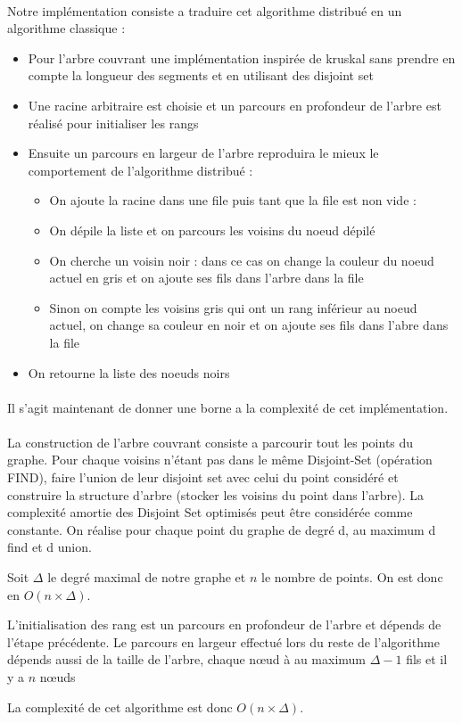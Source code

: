 \paragraph{}
Notre implémentation consiste a traduire cet algorithme distribué en un algorithme classique :
\begin{itemize}
\item Pour l'arbre couvrant une implémentation inspirée de kruskal sans prendre en compte la longueur des segments et en utilisant des disjoint set
\item Une racine arbitraire est choisie et un parcours en profondeur de l'arbre est réalisé pour initialiser les rangs
\item Ensuite un parcours en largeur de l'arbre reproduira le mieux le comportement de l'algorithme distribué :
	\begin{itemize}
	\item On ajoute la racine dans une file puis tant que la file est non vide :
	\item On dépile la liste et on parcours les voisins du noeud dépilé
	\item On cherche un voisin noir : dans ce cas on change la couleur du noeud actuel en gris et on ajoute ses fils dans l'arbre dans la file
	\item Sinon on compte les voisins gris qui ont un rang inférieur au noeud actuel, on change sa couleur en noir et on ajoute ses fils dans l'abre dans la file 
	\end{itemize}
\item On retourne la liste des noeuds noirs
\end{itemize}

\paragraph{}
Il s'agit maintenant de donner une borne a la complexité de cet implémentation.

\paragraph{}
La construction de l'arbre couvrant consiste a parcourir tout les points du graphe. Pour chaque voisins n'étant pas dans le même Disjoint-Set (opération FIND), faire l'union de leur disjoint set avec celui du point considéré et construire la structure d'arbre (stocker les voisins du point dans l'arbre).
La complexité amortie des Disjoint Set optimisés peut être considérée comme constante. On réalise pour chaque point du graphe de degré d, au maximum d find et d union.

Soit $\Delta$ le degré maximal de notre graphe et $n$ le nombre de points. On est donc en $O(n \times \Delta)$.

L’initialisation des rang est un parcours en profondeur de l'arbre et dépends de l'étape précédente.
Le parcours en largeur effectué lors du reste de l'algorithme dépends aussi de la taille de l'arbre, chaque nœud à au maximum $\Delta -1$ fils et il y a $n$ nœuds

La complexité de cet algorithme est donc $O(n \times \Delta)$.
